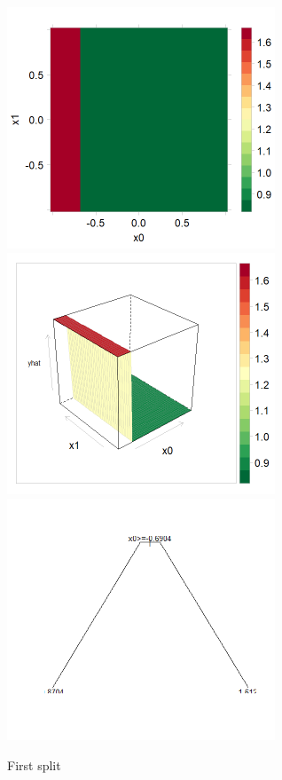 \documentclass[10pt,openany]{article}
\numberwithin{definition}{section}
\numberwithin{example}{section}
\numberwithin{equation}{section}
\numberwithin{figure}{section}
\begin{document}
\begin{figure}
\noindent \begin{centering}
\includegraphics[width=80mm]{fig/rpart-1-split-levelplot}~
\includegraphics[width=80mm]{fig/rpart-1-split-wireframe}~
\includegraphics[width=80mm]{fig/rpart-1-split-tree}
\par\end{centering}

\protect\caption{\label{fig:one-split}First split}
\end{figure}
\end{document}

